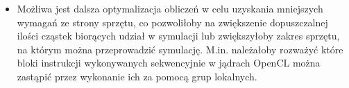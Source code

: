 \documentclass[polish, 12pt]{aghthesis}
\begin{document}
\begin{itemize}
			\item Możliwa jest dalsza optymalizacja obliczeń w celu uzyskania mniejszych wymagań ze strony sprzętu, co pozwoliłoby na zwiększenie dopuszczalnej ilości cząstek biorących udział w symulacji lub zwiększyłoby zakres sprzętu, na którym można przeprowadzić symulację. M.in. należałoby rozważyć które bloki instrukcji wykonywanych sekwencyjnie w jądrach OpenCL można zastąpić przez wykonanie ich za pomocą grup lokalnych.
		\end{itemize}

\nocite{OpenCLProgrammingGuide, GameCodingComplete, CLPP, SPHWebinar, Lucy, MonLat, Boryczko, Lombardi, Monaghan}

\end{document}
